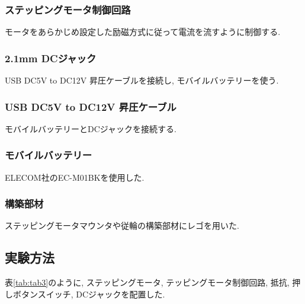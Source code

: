 \documentclass{ltjsarticle} %
\begin{document}
\subsubsection{ステッピングモータ制御回路}
モータをあらかじめ設定した励磁⽅式に従って電流を流すように制御する. 

\subsubsection{2.1mm DCジャック}
USB DC5V to DC12V 昇圧ケーブルを接続し, モバイルバッテリーを使う. 

\subsubsection{USB DC5V to DC12V 昇圧ケーブル}
モバイルバッテリーとDCジャックを接続する. 

\subsubsection{モバイルバッテリー}
ELECOM社のEC-M01BKを使用した. 

\subsubsection{構築部材}
ステッピングモータマウンタや従輪の構築部材にレゴを⽤いた.  

\subsection{実験方法}
表\ref{tab:tab3}のように, ステッピングモータ, テッピングモータ制御回路, 抵抗, 押しボタンスイッチ, 
DCジャックを配置した. 
\end{document}
